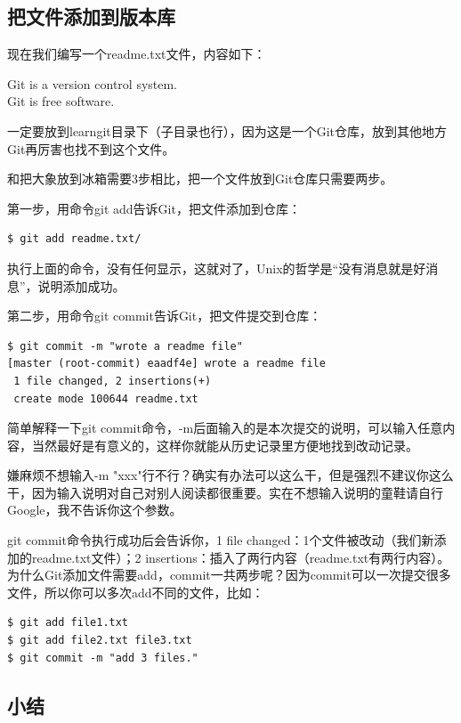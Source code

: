 \documentclass[•]{article}
\begin{document}
\begin{CJK}{UTF8}{gbsn}
\subsection{把文件添加到版本库} 

现在我们编写一个readme.txt文件，内容如下：

\begin{shaded}
Git is a version control system.\\
Git is free software.
\end{shaded}


\qquad 一定要放到learngit目录下（子目录也行），因为这是一个Git仓库，放到其他地方Git再厉害也找不到这个文件。

\qquad 和把大象放到冰箱需要3步相比，把一个文件放到Git仓库只需要两步。

\qquad 第一步，用命令git add告诉Git，把文件添加到仓库：
\begin{lstlisting} 
$ git add readme.txt/
\end{lstlisting}
\qquad 执行上面的命令，没有任何显示，这就对了，Unix的哲学是“没有消息就是好消息”，说明添加成功。

\qquad 第二步，用命令git commit告诉Git，把文件提交到仓库：
\begin{lstlisting} 
$ git commit -m "wrote a readme file"
[master (root-commit) eaadf4e] wrote a readme file
 1 file changed, 2 insertions(+)
 create mode 100644 readme.txt
\end{lstlisting}
\qquad 简单解释一下git commit命令，-m后面输入的是本次提交的说明，可以输入任意内容，当然最好是有意义的，这样你就能从历史记录里方便地找到改动记录。

\qquad 嫌麻烦不想输入-m "xxx"行不行？确实有办法可以这么干，但是强烈不建议你这么干，因为输入说明对自己对别人阅读都很重要。实在不想输入说明的童鞋请自行Google，我不告诉你这个参数。

\qquad git commit命令执行成功后会告诉你，1 file changed：1个文件被改动（我们新添加的readme.txt文件）；2 insertions：插入了两行内容（readme.txt有两行内容）。
\qquad 为什么Git添加文件需要add，commit一共两步呢？因为commit可以一次提交很多文件，所以你可以多次add不同的文件，比如：
\begin{lstlisting} 
$ git add file1.txt
$ git add file2.txt file3.txt
$ git commit -m "add 3 files."
\end{lstlisting}

\subsection{小结}


\end{CJK}
\end{document}

